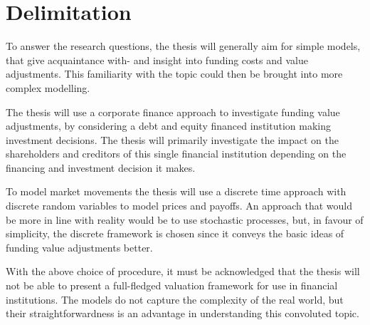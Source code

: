 \documentclass[main.tex]{subfiles}
\begin{document}
    \section{Delimitation}

    To answer the research questions, the thesis will generally aim for simple models,
    that give acquaintance with- and insight into funding costs and value adjustments.
    This familiarity with the topic could then be brought into more complex modelling.

    The thesis will use a corporate finance approach to investigate funding value adjustments,
    by considering a debt and equity financed institution making investment decisions.
    The thesis will primarily investigate the impact on the shareholders and creditors 
    of this single financial institution depending on the financing and investment decision it makes.

    To model market movements the thesis will use a discrete time approach 
    with discrete random variables to model prices and payoffs.
    An approach that would be more in line with reality would be to use stochastic processes,
    but, in favour of simplicity, the discrete framework is chosen 
    since it conveys the basic ideas of funding value adjustments better.

    With the above choice of procedure, it must be acknowledged that the thesis will not be able to
    present a full-fledged valuation framework for use in financial institutions.
    The models do not capture the complexity of the real world,
    but their straightforwardness is an advantage in understanding this convoluted topic.
\end{document}
